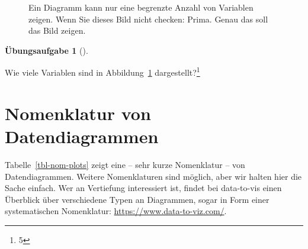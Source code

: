 \documentclass[
  letterpaper,
  twoside,
  open=any]{scrbook}
\theoremstyle{definition}
\theoremstyle{definition}
\newtheorem{exercise}{Übungsaufgabe}[chapter]
\theoremstyle{definition}
\theoremstyle{remark}
\begin{document}
\begin{figure}


\caption{\label{fig-many-dims}Ein Diagramm kann nur eine begrenzte
Anzahl von Variablen zeigen. Wenn Sie dieses Bild nicht checken: Prima.
Genau das soll das Bild zeigen.}

\end{figure}%

\begin{exercise}[]\protect\hypertarget{exr-anz-dims}{}\label{exr-anz-dims}

Wie viele Variablen sind in Abbildung~\ref{fig-many-dims}
dargestellt?\footnote{5}

\end{exercise}

\section{Nomenklatur von
Datendiagrammen}\label{nomenklatur-von-datendiagrammen}

Tabelle~\ref{tbl-nom-plots} zeigt eine -- sehr kurze Nomenklatur -- von
Datendiagrammen. Weitere Nomenklaturen sind möglich, aber wir halten
hier die Sache einfach. Wer an Vertiefung interessiert ist, findet bei
data-to-vis einen Überblick über verschiedene Typen an Diagrammen, sogar
in Form einer systematischen Nomenklatur:
\url{https://www.data-to-viz.com/}.
\end{document}
